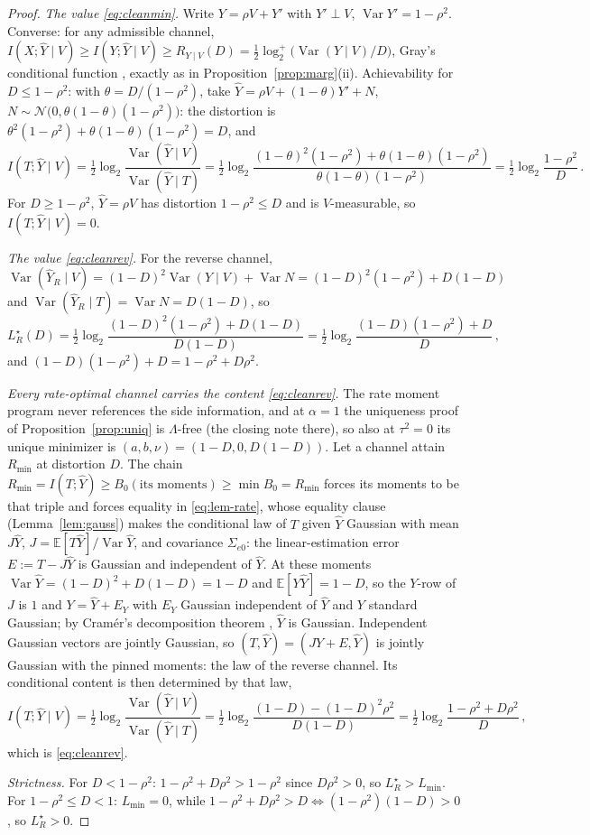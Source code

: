 \documentclass[11pt,onecolumn]{IEEEtran}
\newcommand{\E}{\mathbb{E}}
\newcommand{\hY}{\widehat{Y}}
\newcommand{\LRs}{L_{R}^{\star}}
\begin{document}
\begin{proof}
\emph{The value \eqref{eq:cleanmin}.} Write $Y=\rho V+Y'$ with
$Y'\perp V$, $\operatorname{Var}Y'=1-\rho^2$. Converse: for any
admissible channel, $I(X;\hY\mid V)\ge I(Y;\hY\mid V)\ge R_{Y\mid
V}(D)=\tfrac12\log_2^{+}\bigl(\operatorname{Var}(Y\mid
V)/D\bigr)$, Gray's conditional function \cite{gray1973}, exactly as
in Proposition~\ref{prop:marg}(ii). Achievability for $D\le1-\rho^2$:
with $\theta=D/(1-\rho^2)$, take
$\hY=\rho V+(1-\theta)Y'+N$, $N\sim\mathcal
N\bigl(0,\theta(1-\theta)(1-\rho^2)\bigr)$: the distortion is
$\theta^2(1-\rho^2)+\theta(1-\theta)(1-\rho^2)=D$, and
\[
I(T;\hY\mid V)
=\tfrac12\log_2
\frac{\operatorname{Var}(\hY\mid V)}{\operatorname{Var}(\hY\mid T)}
=\tfrac12\log_2
\frac{(1-\theta)^2(1-\rho^2)+\theta(1-\theta)(1-\rho^2)}
{\theta(1-\theta)(1-\rho^2)}
=\tfrac12\log_2\frac{1-\rho^2}{D}\,.
\]
For $D\ge1-\rho^2$, $\hY=\rho V$ has distortion $1-\rho^2\le D$ and is
$V$-measurable, so $I(T;\hY\mid V)=0$.

\emph{The value \eqref{eq:cleanrev}.} For the reverse channel,
$\operatorname{Var}(\hY_R\mid V)=(1-D)^2\operatorname{Var}(Y\mid
V)+\operatorname{Var}N=(1-D)^2(1-\rho^2)+D(1-D)$ and
$\operatorname{Var}(\hY_R\mid T)=\operatorname{Var}N=D(1-D)$, so
\[
\LRs(D)=\tfrac12\log_2
\frac{(1-D)^2(1-\rho^2)+D(1-D)}{D(1-D)}
=\tfrac12\log_2\frac{(1-D)(1-\rho^2)+D}{D}\,,
\]
and $(1-D)(1-\rho^2)+D=1-\rho^2+D\rho^2$.

\emph{Every rate-optimal channel carries the content
\eqref{eq:cleanrev}.} The rate moment program never references the
side information, and at $\alpha=1$ the uniqueness proof of
Proposition~\ref{prop:uniq} is $\Lambda$-free (the closing note
there), so also at $\tau^2=0$ its unique minimizer is
$(a,b,\nu)=(1-D,0,D(1-D))$. Let a channel attain $R_{\min}$ at
distortion $D$. The chain
$R_{\min}=I(T;\hY)\ge B_0(\text{its moments})\ge\min B_0=R_{\min}$
forces its moments to be that triple and forces equality in
\eqref{eq:lem-rate}, whose equality clause (Lemma~\ref{lem:gauss}) makes
the conditional law of $T$ given $\hY$ Gaussian with mean $J\hY$,
$J=\E[T\hY]/\operatorname{Var}\hY$, and covariance $\Sigma_{e0}$: the
linear-estimation error $E:=T-J\hY$ is Gaussian and independent of
$\hY$. At these moments $\operatorname{Var}\hY=(1-D)^2+D(1-D)=1-D$
and $\E[Y\hY]=1-D$, so the $Y$-row of $J$ is $1$ and
$Y=\hY+E_Y$ with $E_Y$ Gaussian independent of $\hY$ and $Y$ standard
Gaussian; by Cram\'er's decomposition theorem \cite{cramer1936},
$\hY$ is Gaussian. Independent Gaussian vectors are jointly Gaussian,
so $(T,\hY)=(J\hY+E,\hY)$ is jointly Gaussian with the pinned
moments: the law of the reverse channel. Its conditional content is
then determined by that law,
\[
I(T;\hY\mid V)
=\tfrac12\log_2
\frac{\operatorname{Var}(\hY\mid V)}{\operatorname{Var}(\hY\mid T)}
=\tfrac12\log_2\frac{(1-D)-(1-D)^2\rho^2}{D(1-D)}
=\tfrac12\log_2\frac{1-\rho^2+D\rho^2}{D}\,,
\]
which is \eqref{eq:cleanrev}.

\emph{Strictness.} For $D<1-\rho^2$:
$1-\rho^2+D\rho^2>1-\rho^2$ since $D\rho^2>0$, so $\LRs>L_{\min}$. For
$1-\rho^2\le D<1$: $L_{\min}=0$, while
$1-\rho^2+D\rho^2>D\Leftrightarrow(1-\rho^2)(1-D)>0$, so $\LRs>0$.
\end{proof}
\end{document}
